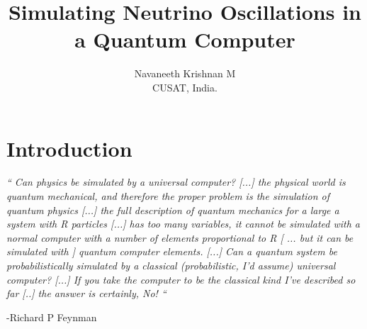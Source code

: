 \documentclass[12pt,a4paper]{report}
\title{
	\huge Simulating Neutrino Oscillations in a Quantum Computer}
\author{\large Navaneeth Krishnan M\\
	\small CUSAT, India.}
\begin{document}
\maketitle
\pagebreak	

\chapter{Introduction}
\emph{“ Can physics be simulated by a universal computer? [...] the physical world is quantum mechanical, and therefore the proper problem is the simulation of quantum physics [...] the full description of quantum mechanics for a large a system with R particles [...] has too many variables, it cannot be simulated with a normal computer with a number of elements proportional to R [ ... but it can be simulated with ] quantum computer elements. [...] Can a quantum system be probabilistically simulated by a classical (probabilistic, I’d assume) universal computer? [...] If you take the computer to be the classical kind I’ve described so far [..] the answer is certainly, No! “} 
\begin{flushright}
-Richard P Feynman \cite{feynman82}\cite{nielsen}
\end{flushright}
\end{document}
